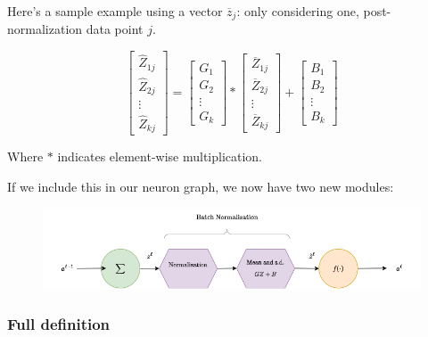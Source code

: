             \miniex Here's a sample example using a vector $\overline{z}_j$: only considering one, post-normalization data point $j$. 

            \begin{equation}
                \begin{bmatrix}
                    \widehat{Z}_{1j} \\  \widehat{Z}_{2j} \\ \vdots \\ \widehat{Z}_{kj}
                \end{bmatrix}
                =
                \begin{bmatrix}
                    G_{1} \\  G_{2} \\ \vdots \\ G_{k}
                \end{bmatrix}
                *
                \begin{bmatrix}
                    \overline{Z}_{1j} \\  \overline{Z}_{2j} \\ \vdots \\ \overline{Z}_{kj}
                \end{bmatrix}
                +
                \begin{bmatrix}
                    B_{1} \\  B_{2} \\ \vdots \\ B_{k}
                \end{bmatrix}
            \end{equation}

            Where $*$ indicates element-wise multiplication.

            If we include this in our neuron graph, we now have two new modules:

            \begin{figure}[H]
                \centering
                    \includegraphics[width=120mm,scale=0.5]{images/nn_2_images/batch_normalization.png}
            \end{figure}

            \subsubsection{Full definition}


